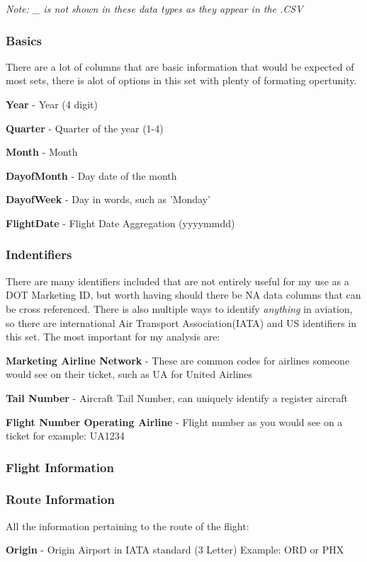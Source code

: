 \documentclass[a4paper,12pt]{article}
\begin{document}
\emph{Note: \_ is not shown in these data types as they appear in the .CSV}

\subsubsection{Basics}
There are a lot of columns that are basic information that would be expected of most sets, there is alot of options in this set with plenty of formating opertunity.

\textbf{Year} - Year (4 digit)

\textbf{Quarter} - Quarter of the year (1-4)

\textbf{Month} - Month

\textbf{DayofMonth} - Day date of the month

\textbf{DayofWeek} - Day in words, such as 'Monday'

\textbf{FlightDate} - Flight Date Aggregation (yyyymmdd)

\subsubsection{Indentifiers}
There are many identifiers included that are not entirely useful for my use as a DOT Marketing ID, but worth having should there be NA data columns that can be cross referenced.
There is also multiple ways to identify \emph{anything} in aviation, so there are international Air Transport Association(IATA) and US identifiers in this set.
The most important for my analysis are:

\textbf{Marketing Airline Network} - These are common codes for airlines someone would see on their ticket, such as UA for United Airlines 

\textbf{Tail Number} - Aircraft Tail Number, can uniquely identify a register aircraft

\textbf{Flight Number Operating Airline} - Flight number as you would see on a ticket for example: UA1234

\subsubsection{Flight Information}

\subsubsection{Route Information}
All the information pertaining to the route of the flight:

\textbf{Origin} - Origin Airport in IATA standard (3 Letter) Example: ORD or PHX
\end{document}
